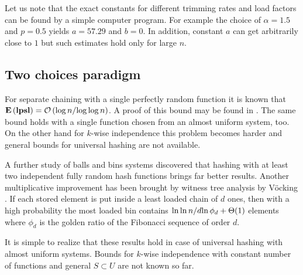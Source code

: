 Let us note that the exact constants for different trimming rates and load factors can be found by a simple computer program.
For example the choice of $\alpha = 1.5$ and $p = 0.5$ yields $a = 57.29$ and $b = 0$.
In addition, constant $a$ can get arbitrarily close to $1$ but such estimates hold only for large $n$.

\subsection{Two choices paradigm}
For separate chaining with a single perfectly random function it is known that $\mathbf{E}\left(\mathbf{lpsl}\right) = \mathcal{O}\left({\log n}/{\log \log n}\right)$. 
A proof of this bound may be found in \cite{DBLP:books/sp/Mehlhorn84}. 
The same bound holds with a single function chosen from an almost uniform system, too.
On the other hand for $k$-wise independence this problem becomes harder and general bounds for universal hashing are not available.

A further study \cite{DBLP:conf/stoc/AzarBKU94} of balls and bins systems discovered that hashing with at least two independent fully random hash functions brings far better results. 
Another multiplicative improvement has been brought by witness tree analysis by Vöcking \cite{DBLP:journals/jacm/Vocking03}. 
If each stored element is put inside a least loaded chain of $d$ ones, then with a high probability the most loaded bin contains ${\ln \ln n}/d {\ln \phi_d} + \mathrm{\Theta}(1)$ elements \cite{DBLP:journals/jacm/Vocking03} where $\phi_d$ is the golden ratio of the Fibonacci sequence of order $d$. 

It is simple to realize that these results hold in case of universal hashing with almost uniform systems. Bounds for $k$-wise independence with constant number of functions and general $S \subset U$ are not known so far.

